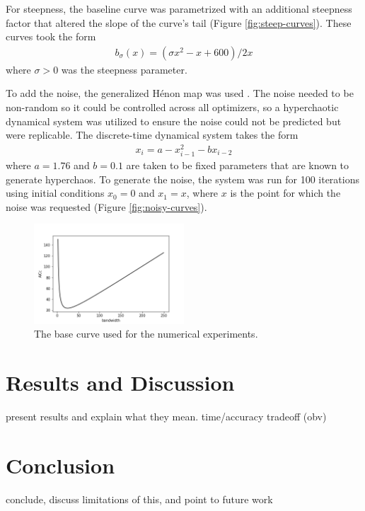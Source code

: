 \documentclass[letterpaper,12pt,twocolumn]{article}
\begin{document}
For steepness, the baseline curve was parametrized with an additional steepness factor that altered the slope of the curve's tail (Figure \ref{fig:steep-curves}). These curves took the form \begin{align*}
    b_\sigma(x) = (\sigma x^2 - x + 600)/2x
\end{align*} where $\sigma > 0$ was the steepness parameter.

To add the noise, the generalized Hénon map was used \cite{Henon1976}. The noise needed to be non-random so it could be controlled across all optimizers, so a hyperchaotic dynamical system was utilized to ensure the noise could not be predicted but were replicable. The discrete-time dynamical system takes the form \begin{align*}
    x_i = a - x_{i-1}^2 - bx_{i-2}
\end{align*} where $a = 1.76$ and $b = 0.1$ are taken to be fixed parameters that are known to generate hyperchaos. To generate the noise, the system was run for 100 iterations using initial conditions $x_0 = 0$ and $x_1 = x$, where $x$ is the point for which the noise was requested (Figure \ref{fig:noisy-curves}). 

\begin{figure}
    \centering
    \includegraphics[width=0.5\textwidth]{../figures/baseline.png} 
    \caption{The base curve used for the numerical experiments.}
    \label{fig:baseline}
\end{figure}

\section{Results and Discussion}
\label{sec:results}
present results and explain what they mean. time/accuracy tradeoff (obv)

\section{Conclusion}
\label{sec:conclusion}
conclude, discuss limitations of this, and point to future work
\end{document}
